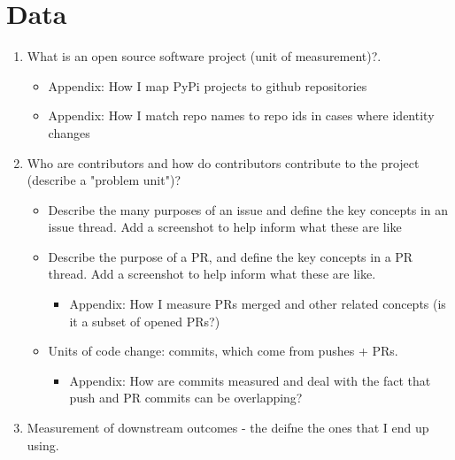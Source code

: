 \documentclass[12pt,notitlepage]{article}
\begin{document}

\section{Data} \label{sec:data}
\begin{enumerate}
    \item What is an open source software project (unit of measurement)?.
    \begin{itemize}
        \item Appendix: How I map PyPi projects to github repositories
        \item Appendix: How I match repo names to repo ids in cases where identity changes
    \end{itemize}
    \item Who are contributors and how do contributors contribute to the project (describe a "problem unit")?
    \begin{itemize}
        \item Describe the many purposes of an issue and define the key concepts in an issue thread. Add a screenshot to help inform what these are like
        \item Describe the purpose of a PR, and define the key concepts in a PR thread. Add a screenshot to help inform what these are like. 
        \begin{itemize}
            \item Appendix: How I measure PRs merged and other related concepts (is it a subset of opened PRs?)
        \end{itemize}
        \item Units of code change: commits, which come from pushes + PRs. 
        \begin{itemize}
            \item Appendix: How are commits measured and deal with the fact that push and PR commits can be overlapping? 
        \end{itemize}
    \end{itemize}
    \item Measurement of downstream outcomes - the deifne the ones that I end up using. 

\end{enumerate}
\end{document}

